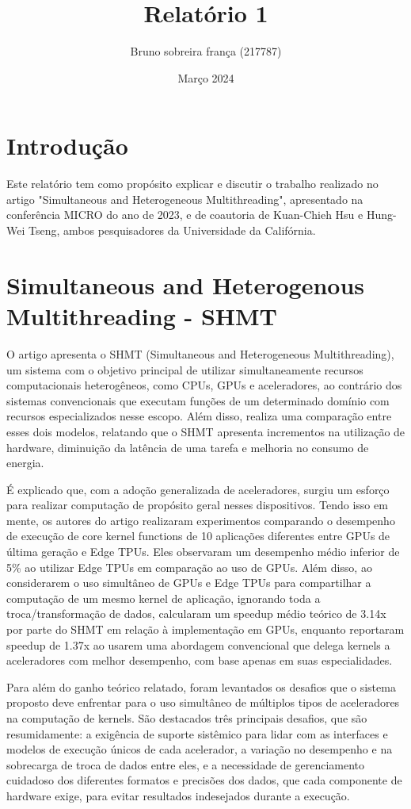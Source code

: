 \documentclass{article}
\title{Relatório 1}
\author{Bruno sobreira frança (217787)}
\date{Março 2024}
\begin{document}
\maketitle

\section{Introdução}

Este relatório tem como propósito explicar e discutir o trabalho realizado no artigo "Simultaneous and Heterogeneous Multithreading", apresentado na conferência MICRO do ano de 2023, e de coautoria de Kuan-Chieh Hsu e Hung-Wei Tseng, ambos pesquisadores da Universidade da Califórnia.

\section{Simultaneous and Heterogenous Multithreading - SHMT}
O artigo apresenta o SHMT (Simultaneous and Heterogeneous Multithreading), um sistema com o objetivo principal de utilizar simultaneamente recursos computacionais heterogêneos, como CPUs, GPUs e aceleradores, ao contrário dos sistemas convencionais que executam funções de um determinado domínio com recursos especializados nesse escopo. Além disso, realiza uma comparação entre esses dois modelos, relatando que o SHMT apresenta incrementos na utilização de hardware, diminuição da latência de uma tarefa e melhoria no consumo de energia.

É explicado que, com a adoção generalizada de aceleradores, surgiu um esforço para realizar computação de propósito geral nesses dispositivos. Tendo isso em mente, os autores do artigo realizaram experimentos comparando o desempenho de execução de core kernel functions de 10 aplicações diferentes entre GPUs de última geração e Edge TPUs. Eles observaram um desempenho médio inferior de 5\% ao utilizar Edge TPUs em comparação ao uso de GPUs. Além disso, ao considerarem o uso simultâneo de GPUs e Edge TPUs para compartilhar a computação de um mesmo kernel de aplicação, ignorando toda a troca/transformação de dados, calcularam um speedup médio teórico de 3.14x por parte do SHMT em relação à implementação em GPUs, enquanto reportaram speedup de 1.37x ao usarem uma abordagem convencional que delega kernels a aceleradores com melhor desempenho, com base apenas em suas especialidades.

Para além do ganho teórico relatado, foram levantados os desafios que o sistema proposto deve enfrentar para o uso simultâneo de múltiplos tipos de aceleradores na computação de kernels. São destacados três principais desafios, que são resumidamente: a exigência de suporte sistêmico para lidar com as interfaces e modelos de execução únicos de cada acelerador, a variação no desempenho e na sobrecarga de troca de dados entre eles, e a necessidade de gerenciamento cuidadoso dos diferentes formatos e precisões dos dados, que cada componente de hardware exige, para evitar resultados indesejados durante a execução.
\end{document}
